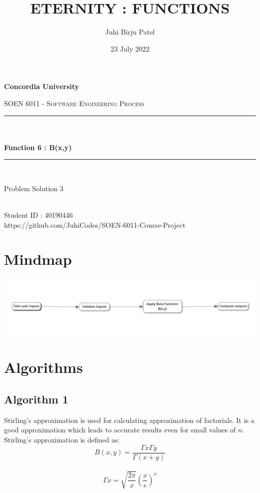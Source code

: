 \documentclass[12pt]{report}
\title{ETERNITY : FUNCTIONS}
\author{Juhi Birju Patel}
\date{23 July 2022}
\makeatletter
\let\thetitle\@title
\let\theauthor\@author
\makeatother
\begin{document}
\begin{titlepage}
	\centering
    \vspace*{0.5 cm}
\begin{center}    \textbf{\Large Concordia University}\\[2.0 cm]	\end{center}
	\textsc{\Large  SOEN 6011 - Software Engineering Process }\\[0.5 cm]
	\rule{\linewidth}{0.2 mm} \\[0.4 cm]
	{ \huge \textbf \thetitle}\\[0.2 cm]
	{ \huge \textbf{ Function 6 : B(x,y)}}
	\rule{\linewidth}{0.2 mm} \\[1.5 cm]

\begin{center}   {\Large Problem Solution 3}\\[2.0 cm]
\end{center}	
\begin{center}   {\Large \textbf{\theauthor}} \\[0.2 cm]
                 {\large Student ID : 40190446 }\\[0.2 cm]
                 {\large https://github.com/JuhiCodes/SOEN-6011-Course-Project}
\end{center}
	
\end{titlepage}

\tableofcontents
\pagebreak
\renewcommand{\thesection}{\arabic{section}}
\newpage
\section{Mindmap}
\begin{center}
   \includegraphics[scale=0.45]{images/mindmap.png}
    \end{center}
\section{Algorithms}
\subsection{Algorithm 1}
Stirling's approximation is used for calculating approximation of factorials. It is a good approximation which leads to accurate results even for small values of $n$. Stirling's approximation is defined as:\\
$$B(x,y)=\frac{\Gamma x \Gamma y}{\Gamma (x+y)}$$\\
\newline
$$\Gamma x = \sqrt{\frac{2 \pi}{x}}(\frac{x}{e})^x$$\\
\end{document}
